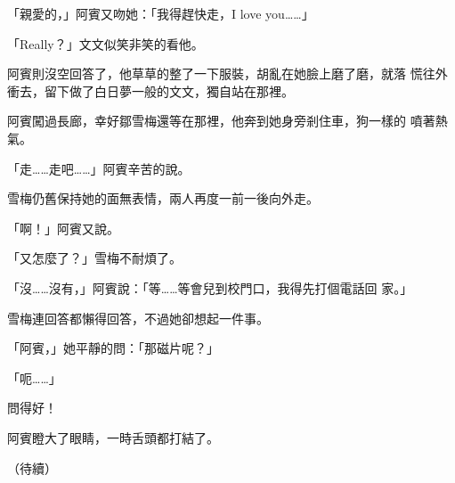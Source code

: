 「親愛的，」阿賓又吻她：「我得趕快走，I love you……」

「Really？」文文似笑非笑的看他。

阿賓則沒空回答了，他草草的整了一下服裝，胡亂在她臉上磨了磨，就落
慌往外衝去，留下做了白日夢一般的文文，獨自站在那裡。

阿賓闖過長廊，幸好鄒雪梅還等在那裡，他奔到她身旁剎住車，狗一樣的
噴著熱氣。

「走……走吧……」阿賓辛苦的說。

雪梅仍舊保持她的面無表情，兩人再度一前一後向外走。

「啊！」阿賓又說。

「又怎麼了？」雪梅不耐煩了。

「沒……沒有，」阿賓說：「等……等會兒到校門口，我得先打個電話回
家。」

雪梅連回答都懶得回答，不過她卻想起一件事。

「阿賓，」她平靜的問：「那磁片呢？」

「呃……」

問得好！

阿賓瞪大了眼睛，一時舌頭都打結了。

（待續）










